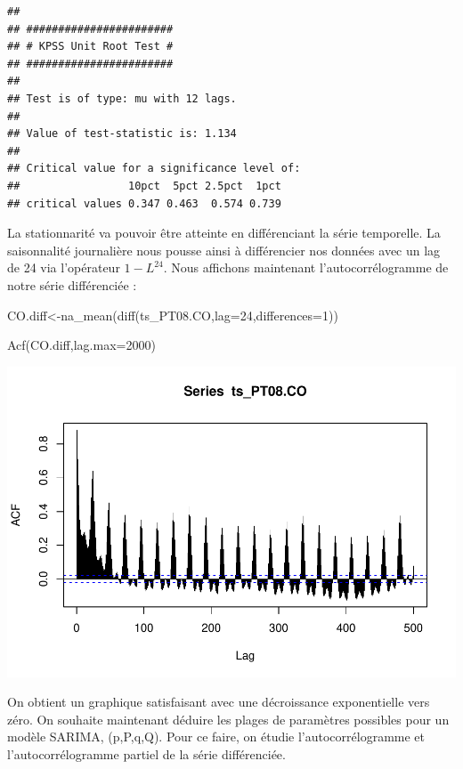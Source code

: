\documentclass[
]{article}
\newenvironment{Shaded}{\begin{snugshade}}{\end{snugshade}}
\newcommand{\AttributeTok}[1]{\textcolor[rgb]{0.77,0.63,0.00}{#1}}
\newcommand{\DecValTok}[1]{\textcolor[rgb]{0.00,0.00,0.81}{#1}}
\newcommand{\FunctionTok}[1]{\textcolor[rgb]{0.00,0.00,0.00}{#1}}
\newcommand{\NormalTok}[1]{#1}
\newcommand{\OtherTok}[1]{\textcolor[rgb]{0.56,0.35,0.01}{#1}}
\begin{document}
\begin{verbatim}
## 
## ####################### 
## # KPSS Unit Root Test # 
## ####################### 
## 
## Test is of type: mu with 12 lags. 
## 
## Value of test-statistic is: 1.134 
## 
## Critical value for a significance level of: 
##                 10pct  5pct 2.5pct  1pct
## critical values 0.347 0.463  0.574 0.739
\end{verbatim}

La stationnarité va pouvoir être atteinte en différenciant la série
temporelle. La saisonnalité journalière nous pousse ainsi à différencier
nos données avec un lag de 24 via l'opérateur \(1-L^{24}\). Nous
affichons maintenant l'autocorrélogramme de notre série différenciée :

\begin{Shaded}
\begin{Highlighting}[]
\NormalTok{CO.diff}\OtherTok{\textless{}{-}}\FunctionTok{na\_mean}\NormalTok{(}\FunctionTok{diff}\NormalTok{(ts\_PT08.CO,}\AttributeTok{lag=}\DecValTok{24}\NormalTok{,}\AttributeTok{differences=}\DecValTok{1}\NormalTok{))}

\FunctionTok{Acf}\NormalTok{(CO.diff,}\AttributeTok{lag.max=}\DecValTok{2000}\NormalTok{)}
\end{Highlighting}
\end{Shaded}

\includegraphics{STA202_report_files/figure-latex/unnamed-chunk-9-1.pdf}

On obtient un graphique satisfaisant avec une décroissance exponentielle
vers zéro. On souhaite maintenant déduire les plages de paramètres
possibles pour un modèle SARIMA, (p,P,q,Q). Pour ce faire, on étudie
l'autocorrélogramme et l'autocorrélogramme partiel de la série
différenciée.
\end{document}
